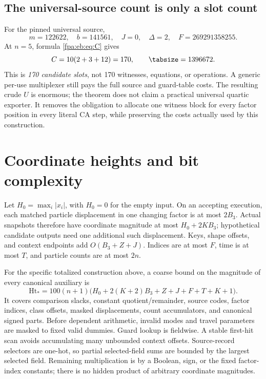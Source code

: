 \documentclass[11pt,a4paper]{article}
\numberwithin{equation}{section}
\begin{document}
\subsection{The universal-source count is only a slot count}
For the pinned universal source,
\[
m=122622,\quad b=141561,\quad J=0,\quad\Delta=2,
\quad F=269291358255.
\]
At $n=5$, formula \eqref{fpa:eb:eq:C} gives
\[
C=10(2+3+12)=170,\qquad \tabsize=1396672.
\]
This is \emph{170 candidate slots}, not 170 witnesses, equations, or operations. A generic per-use multiplexer still pays the full source and guard-table costs. The resulting crude $U$ is enormous; the theorem does not claim a practical universal quartic exporter. It removes the obligation to allocate one witness block for every factor position in every literal CA step, while preserving the costs actually used by this construction.

\section{Coordinate heights and bit complexity}\label{fpa:eb:sec:bits}
Let $H_0=\max_i|x_i|$, with $H_0=0$ for the empty input. On an accepting execution, each matched particle displacement in one changing factor is at most $2B_3$. Actual snapshots therefore have coordinate magnitude at most $H_0+2KB_3$; hypothetical candidate outputs need one additional such displacement. Keys, shape offsets, and context endpoints add $O(B_3+Z+J)$. Indices are at most $F$, time is at most $T$, and particle counts are at most $2n$.

For the specific totalized construction above, a coarse bound on the magnitude of every canonical auxiliary is
\begin{equation}\label{fpa:eb:eq:height}
\mathrm{Ht}_* =100(n+1)\bigl(H_0+2(K+2)B_3+Z+J+F+T+K+1\bigr).
\end{equation}
It covers comparison slacks, constant quotient/remainder, source codes, factor indices, class offsets, masked displacements, count accumulators, and canonical signed parts. Before dependent arithmetic, invalid modes and travel parameters are masked to fixed valid dummies. Guard lookup is fieldwise. A stable first-hit scan avoids accumulating many unbounded context offsets. Source-record selectors are one-hot, so partial selected-field sums are bounded by the largest selected field. Remaining multiplication is by a Boolean, sign, or the fixed factor-index constants; there is no hidden product of arbitrary coordinate magnitudes.
\end{document}
